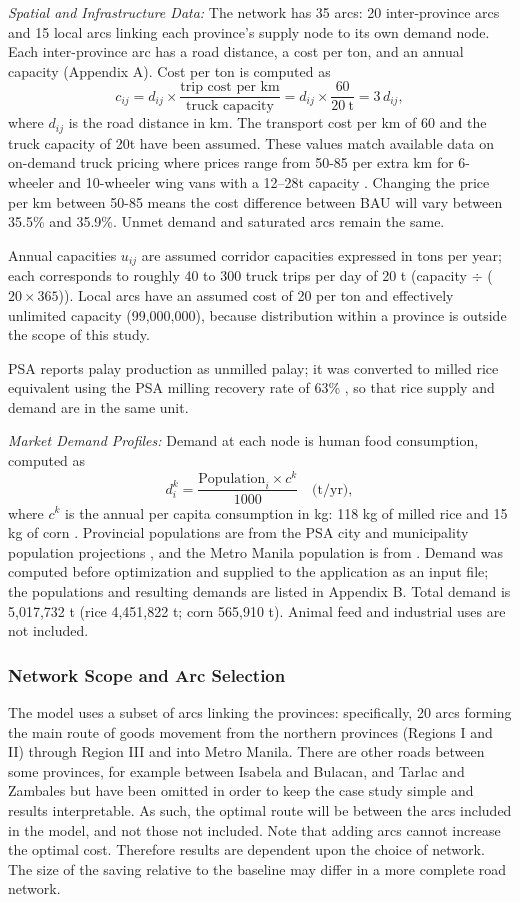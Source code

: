 \documentclass{icsthesis}
\begin{document}
\begin{mainmatter}
\textit{Spatial and Infrastructure Data:} The network has 35 arcs: 20 inter-province arcs and 15 local arcs linking each province's supply node to its own demand node. Each inter-province arc has a road distance, a cost per ton, and an annual capacity (Appendix A). Cost per ton is computed as
\[
c_{ij} = d_{ij} \times \frac{\text{trip cost per km}}{\text{truck capacity}} = d_{ij} \times \frac{60}{20\ \text{t}} = 3\, d_{ij},
\]
where $d_{ij}$ is the road distance in km. The transport cost per km of 60 and the truck capacity of 20t have been assumed. These values match available data on on-demand truck pricing where prices range from 50-85 per extra km for 6-wheeler and 10-wheeler wing vans with a 12--28t capacity \citep{transportify2026}. Changing the price per km between 50-85 means the cost difference between BAU will vary between 35.5\% and 35.9\%. Unmet demand and saturated arcs remain the same.

Annual capacities $u_{ij}$ are assumed corridor capacities expressed in tons per year; each corresponds to roughly 40 to 300 truck trips per day of 20 t (capacity $\div$ ($20 \times 365$)). Local arcs have an assumed cost of 20 per ton and effectively unlimited capacity (99,000,000), because distribution within a province is outside the scope of this study.

PSA reports palay production as unmilled palay; it was converted to milled rice equivalent using the PSA milling recovery rate of 63\% \citep{usda2025}, so that rice supply and demand are in the same unit.

\textit{Market Demand Profiles:} Demand at each node is human food consumption, computed as
\[
d_i^k = \frac{\text{Population}_i \times c^k}{1000}\quad \text{(t/yr)},
\]
where $c^k$ is the annual per capita consumption in kg: 118 kg of milled rice \citep{da2020} and 15 kg of corn \citep{pcaf2023}. Provincial populations are from the PSA city and municipality population projections \citep{psa2025pop}, and the Metro Manila population is from \citet{macrotrends2025}. Demand was computed before optimization and supplied to the application as an input file; the populations and resulting demands are listed in Appendix B. Total demand is 5,017,732 t (rice 4,451,822 t; corn 565,910 t). Animal feed and industrial uses are not included.


\subsubsection{Network Scope and Arc Selection}
The model uses a subset of arcs linking the provinces: specifically, 20 arcs forming the main route of goods movement from the northern provinces (Regions I and II) through Region III and into Metro Manila. There are other roads between some provinces, for example between Isabela and Bulacan, and Tarlac and Zambales but have been omitted in order to keep the case study simple and results interpretable. As such, the optimal route will be between the arcs included in the model, and not those not included. Note that adding arcs cannot increase the optimal cost. Therefore results are dependent upon the choice of network. The size of the saving relative to the baseline may differ in a more complete road network.



\end{mainmatter}
\end{document}

